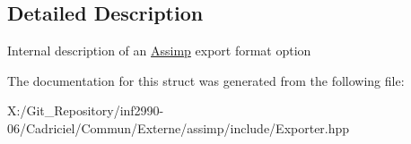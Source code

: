 \subsection{Detailed Description}
Internal description of an \hyperlink{namespace_assimp}{Assimp} export format option 

The documentation for this struct was generated from the following file\-:\begin{DoxyCompactItemize}
\item 
X\-:/\-Git\-\_\-\-Repository/inf2990-\/06/\-Cadriciel/\-Commun/\-Externe/assimp/include/Exporter.\-hpp\end{DoxyCompactItemize}
